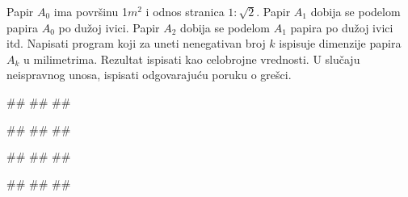 \begin{Exercise}[difficulty=1, label=PET_33] 
Papir $A_0$ ima površinu 1$m^2$ i odnos stranica
$1:\sqrt{2}$. Papir $A_1$ dobija se podelom papira $A_0$ po dužoj
ivici. Papir $A_2$ dobija se podelom $A_1$ papira po dužoj ivici
itd. Napisati program koji za uneti nenegativan broj $k$ ispisuje 
dimenzije papira $A_k$ u milimetrima. Rezultat ispisati kao celobrojne
vrednosti. U slučaju neispravnog unosa, ispisati odgovarajuću poruku o grešci.
  
\begin{miditest}
\begin{upotreba}{1}
#\naslovInt#
##
##
\end{upotreba}
\end{miditest}
\begin{miditest}
\begin{upotreba}{2}
#\naslovInt#
##
##
\end{upotreba}
\end{miditest}

\begin{miditest}
\begin{upotreba}{3}
#\naslovInt#
##
##
\end{upotreba}
\end{miditest}
\begin{miditest}
\begin{upotreba}{4}
#\naslovInt#
##
##
\end{upotreba}
\end{miditest}
\end{Exercise}
\ifresenja
\begin{Answer}[ref=PET_33]
\end{Answer}
\fi


